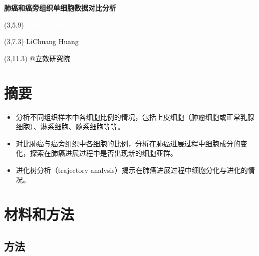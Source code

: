 \documentclass[
]{article}
\author{}
\date{\vspace{-2.5em}}
\providecommand{\tightlist}{%
  \setlength{\itemsep}{0pt}\setlength{\parskip}{0pt}}
\begin{document}
\begin{titlepage} 
\begin{center} \textbf{\Huge
肺癌和癌旁组织单细胞数据对比分析} \vspace{4em}
\begin{textblock}{10}(3,5.9) \huge
\textbf{\textcolor{white}{2023-11-28}}
\end{textblock} \begin{textblock}{10}(3,7.3)
\Large \textcolor{black}{LiChuang Huang}
\end{textblock} \begin{textblock}{10}(3,11.3)
\Large \textcolor{black}{@立效研究院}
\end{textblock} \end{center} \end{titlepage}
\restoregeometry


\tableofcontents

\listoffigures

\listoftables

\newpage


\hypertarget{abstract}{%
\section{摘要}\label{abstract}}

\begin{itemize}
\tightlist
\item
  分析不同组织样本中各细胞比例的情况，包括上皮细胞（肿瘤细胞或正常乳腺细胞）、淋系细胞、髓系细胞等等。
\item
  对比肺癌与癌旁组织中各细胞的比例，分析在肺癌进展过程中细胞成分的变化，探索在肺癌进展过程中是否出现新的细胞亚群。
\item
  进化树分析（trajectory analysis）揭示在肺癌进展过程中细胞分化与进化的情况。
\end{itemize}

\hypertarget{methods}{%
\section{材料和方法}\label{methods}}

\hypertarget{ux65b9ux6cd5}{%
\subsection{方法}\label{ux65b9ux6cd5}}
\end{document}
